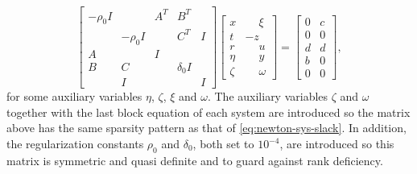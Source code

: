 \documentclass{amsart}
\begin{document}
\[
  \begin{bmatrix}
    -\rho_0 I &           & A^T & B^T        &   \\
              & -\rho_0 I &     & C^T        & I \\
     A        &           & I   &            &   \\
     B        &  C        &     & \delta_0 I &   \\
              &  I        &     &            & I
  \end{bmatrix}
  \begin{bmatrix}
    x     & \phantom{-}\xi \\
    t     & -z  \\
    r     & \phantom{-}u   \\
    \eta  & \phantom{-}y   \\
    \zeta & \phantom{-}\omega
  \end{bmatrix}
  =
  \begin{bmatrix}
    0 & c \\
    0 & 0 \\
    d & d \\
    b & 0 \\
    0 & 0
  \end{bmatrix},
\]
for some auxiliary variables $\eta$, $\zeta$, $\xi$ and $\omega$. The
auxiliary variables $\zeta$ and $\omega$ together with the last block equation
of each system are introduced so the  matrix above has the same
sparsity pattern as that of \eqref{eq:newton-sys-slack}. In addition, the
regularization constants $\rho_0$ and $\delta_0$, both set to $10^{-4}$,  are
introduced so this  matrix is symmetric and quasi definite and to
guard against rank deficiency.
\end{document}
